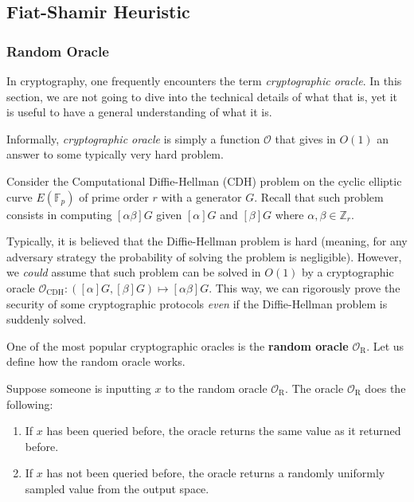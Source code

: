 \documentclass[../lecture-notes-148x210.tex]{subfiles}
\begin{document}
\subsection{Fiat-Shamir Heuristic}

\subsubsection{Random Oracle}

In cryptography, one frequently encounters the term \textit{cryptographic oracle}. In this section, we are not going to dive into the technical details of what that is, yet it is useful to have a general understanding of what it is.

\begin{definition}
    Informally, \textit{cryptographic oracle} is simply a function $\mathcal{O}$ that gives in $O(1)$ an answer to some typically very hard problem.     
\end{definition}

\begin{example}
    Consider the Computational Diffie-Hellman (CDH) problem on the cyclic elliptic curve $E(\mathbb{F}_p)$ of prime order $r$ with a generator $G$. Recall that such problem consists in computing $[\alpha\beta]G$ given $[\alpha]G$ and $[\beta]G$ where $\alpha,\beta \in \mathbb{Z}_r$. 

    Typically, it is believed that the Diffie-Hellman problem is hard (meaning, for any adversary strategy the probability of solving the problem is negligible). However, we \textit{could} assume that such problem can be solved in $O(1)$ by a cryptographic oracle $\mathcal{O}_{\text{CDH}}: ([\alpha]G,[\beta]G) \mapsto [\alpha\beta]G$. This way, we can rigorously prove the security of some cryptographic protocols \textit{even} if the Diffie-Hellman problem is suddenly solved. 
\end{example}

One of the most popular cryptographic oracles is the \textbf{random oracle} $\mathcal{O}_{\text{R}}$. Let us define how the random oracle works.

Suppose someone is inputting $x$ to the random oracle $\mathcal{O}_{\text{R}}$. The oracle $\mathcal{O}_{\text{R}}$ does the following:
\begin{enumerate}
    \item If $x$ has been queried before, the oracle returns the same value as it returned before.
    \item If $x$ has not been queried before, the oracle returns a randomly uniformly sampled value from the output space.
\end{enumerate}
\end{document}
